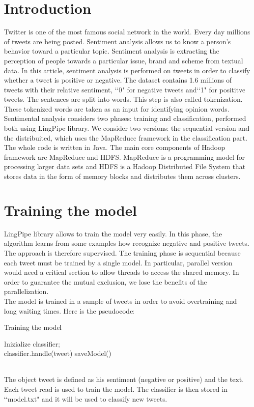 \documentclass[10pt,twocolumn,letterpaper]{article}
\begin{document}
\section{Introduction}
Twitter is one of the most famous social network in the world. Every day millions of tweets are being posted. Sentiment analysis allows us to know a person’s behavior toward a particular topic.
Sentiment analysis is extracting the perception of people towards a particular issue, brand and scheme from textual data.
In this article, sentiment analysis is performed on tweets in order to classify whether a tweet is positive or negative. The dataset contains 1.6 millions of tweets with their relative sentiment, \lq \lq 0" for negative tweets and\lq \lq1" for posititve tweets. The sentences are split into words. This step is also called tokenization. These tokenized words are taken as an input for identifying opinion words.\\
Sentimental analysis considers two phases: training and classification, performed both using LingPipe library. We consider two versions: the sequential version and the distribuited, which uses the MapReduce framework in the classification part. The whole code is written in Java.
The main core components of Hadoop framework are MapReduce and HDFS. MapReduce is a programming model for processing larger data sets and HDFS is a Hadoop Distributed File System that stores data in the form of memory blocks and distributes them across clusters.


\section{Training the model}
LingPipe library allows to train the model very easily. In this phase, the algorithm learns from some examples how recognize negative and positive tweets. The approach is therefore supervised. The training phase is sequential because each tweet must be trained by a single model. In particular, parallel version would need a critical section to allow threads to access the shared memory. In order to guarantee the mutual exclusion, we lose the benefits of the parallelization.
\\The model is trained in a sample of tweets in order to avoid overtraining and long waiting times. Here is the pseudocode:\\
\begin{algorithm}
\label{Training the model}
\caption{Training the model}
\begin{algorithmic}
	\State Inizialize classifier;
    		 \do \\
			\State classifier.handle(tweet)
		\EndFor
    		\State saveModel()	
\end{algorithmic}
\end{algorithm} 
\\
The object tweet is defined as his sentiment (negative or positive) and the text. Each tweet read is used to train the model. The classifier is then stored in \lq\lq model.txt" and it will be used to classify new tweets.
\end{document}
